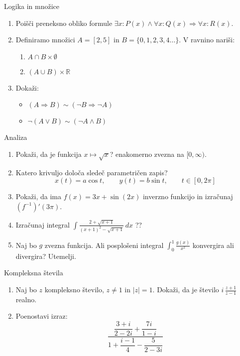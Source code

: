 \begin{frame}{Logika in množice}
	\begin{enumerate}
		\item
		Poišči preneksno obliko formule
		$ \exists x : P(x) \land \forall x : Q(x) \Rightarrow \forall x : R(x). $
		\item 
		Definiramo množici $A = [2,5]$ in $B = \{0,1,2,3,4 \ldots\}$.
		V ravnino nariši:
		\begin{enumerate}
		   \item $A \cap B \times \emptyset$
		   \item $(A \cup B)\times \mathbb{R}$
		\end{enumerate}
		\item
		Dokaži:
		\begin{itemize}
			\item $(A \Rightarrow B) \sim (\neg B \Rightarrow \neg A) $
			\item $\neg(A \lor B) \sim (\neg A \land B)$
		\end{itemize}
	\end{enumerate}
\end{frame}

\begin{frame}{Analiza}
	\begin{enumerate}
		\item
		Pokaži, da je funkcija $x \mapsto \sqrt{x}$? enakomerno zvezna na $[0,\infty)$.
		\item 
		Katero krivuljo določa sledeč parametričen zapis?
		$$
		   x(t) = a \cos t, \qquad %
		   y(t) = b \sin t, \qquad %
		   t \in [0, 2 \pi]
		$$ 
		\item
		Pokaži, da ima  $f (x) = 3x + \sin(2x)$ inverzno funkcijo in izračunaj $(f^{-1})'(3\pi)$.
		
		\item
		Izračunaj integral $ \displaystyle{ \int \frac{2+\sqrt{x+1}}{(x+1)^2 - \sqrt{x+1}} } \, dx$
		??
		\item 
		Naj bo $g$ zvezna funkcija. Ali posplošeni integral 
		$ \int_{0}^{1} \frac{g(x)}{x^2}$
		konvergira ali divergira? Utemelji.
	\end{enumerate}
\end{frame}

\begin{frame}{Kompleksna števila}
	\begin{enumerate}
		\item
		Naj bo $z$ kompleksno število, $z \ne 1$ in $|z|=1$.
		Dokaži, da je število \( i \, \frac{z+1}{z-1} \) realno.
		\item
		Poenostavi izraz:
		$$ \frac{
			\dfrac{3+i}{2-2i} + \dfrac{7i}{1-i}
		}{
			1 + \dfrac{i-1}{4}-\dfrac{5}{2-3i}
		} $$
	\end{enumerate}
\end{frame}